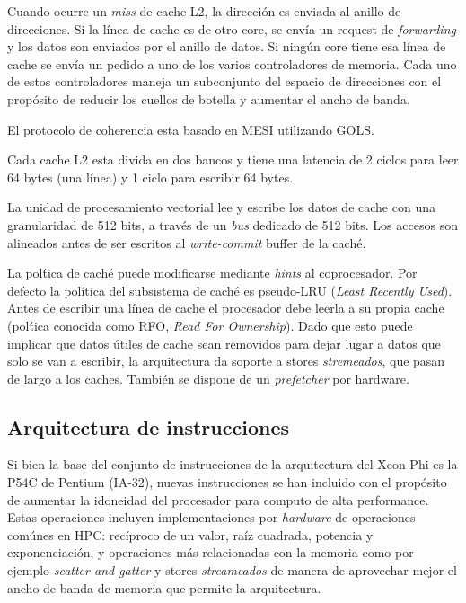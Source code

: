 Cuando ocurre un \textit{miss} de cache L2, la direcci\'on es enviada al anillo de direcciones. Si la l\'inea de cache
es de otro core, se env\'ia un request de \textit{forwarding} y los datos son enviados por el anillo de datos. Si ning\'un
core tiene esa l\'inea de cache se env\'ia un pedido a uno de los varios controladores de memoria. Cada uno de estos controladores
maneja un subconjunto del espacio de direcciones con el prop\'osito de reducir los cuellos de botella y aumentar el ancho de banda.

El protocolo de coherencia esta basado en MESI utilizando GOLS.

Cada cache L2 esta divida en dos bancos y tiene una latencia de 2 ciclos para leer 64 bytes (una l\'inea) y 1 ciclo para escribir 64 bytes.

La unidad de procesamiento vectorial lee y escribe los datos de cache con una granularidad de 512 bits, a trav\'es de un
\textit{bus} dedicado de 512 bits. Los accesos son alineados antes de ser escritos al \textit{write-commit} buffer de la
cach\'e.

La pol\'tica de cach\'e puede modificarse mediante \textit{hints} al coprocesador. Por defecto la pol\'itica del subsistema
de cach\'e es pseudo-LRU (\textit{Least Recently Used}). Antes de escribir una l\'inea de cache el procesador debe leerla a su propia
cache (pol\'tica conocida como RFO, \textit{Read For Ownership}). Dado que esto puede implicar que datos \'utiles de cache
sean removidos para dejar lugar a datos que solo se van a escribir, la arquitectura da soporte a stores \textit{stremeados},
que pasan de largo a los caches. Tambi\'en se dispone de un \textit{prefetcher} por hardware.

\subsection{Arquitectura de instrucciones}

Si bien la base del conjunto de instrucciones de la arquitectura del Xeon Phi es la P54C de Pentium (IA-32), nuevas instrucciones
se han incluido con el prop\'osito de aumentar la idoneidad del procesador para computo de alta performance. 
Estas operaciones incluyen implementaciones por \textit{hardware} de operaciones com\'unes en HPC: rec\'iproco de un valor, 
ra\'iz cuadrada, potencia y exponenciaci\'on, y operaciones m\'as relacionadas con la memoria como por ejemplo \textit{scatter and gatter} 
y stores \textit{streameados} de manera de aprovechar mejor el ancho de banda de memoria que permite la arquitectura.

